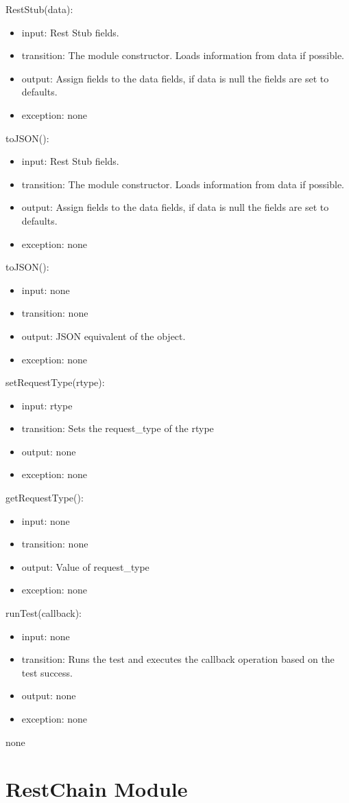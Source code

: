 \documentclass[12pt, titlepage]{article}
\newcommand{\newAccessProgram}[5]{
	\noindent #1:
		\begin{itemize}
		    \item input: #2
			\item transition: #3
			\item output: #4
			\item exception: #5
		\end{itemize}
}
\begin{document}
	{%
		\newAccessProgram{RestStub(data)}
			{%
				Rest Stub fields.
			}
			{%
				The module constructor. Loads information from data if possible.
			}
			{%
				Assign fields to the data fields, if data is null the fields are set to defaults.
			}
			{%
				none
			}
		\newAccessProgram{toJSON()}
			{%
				Rest Stub fields.
			}
			{%
				The module constructor. Loads information from data if possible.
			}
			{%
				Assign fields to the data fields, if data is null the fields are set to defaults.
			}
			{%
				none
			}
		\newAccessProgram{toJSON()}
			{%
				none
			}
			{%
				none
			}
			{%
				JSON equivalent of the object.
			}
			{%
				none
			}
		\newAccessProgram{setRequestType(rtype)}
			{%
				rtype
			}
			{%
				Sets the request\_type of the rtype
			}
			{%
				none
			}
			{%
				none
			}
		\newAccessProgram{getRequestType()}
			{%
				none
			}
			{%
				none
			}
			{%
				Value of request\_type
			}
			{%
				none
			}
			\newAccessProgram{runTest(callback)}
			{%
				none
			}
			{%
				Runs the test and executes the callback operation based on the test success.
			}
			{%
				none
			}
			{%
				none
			}
	}
	{%
		none
	}
	
\newpage


\section {RestChain Module}

\label{RestChain}
\end{document}
